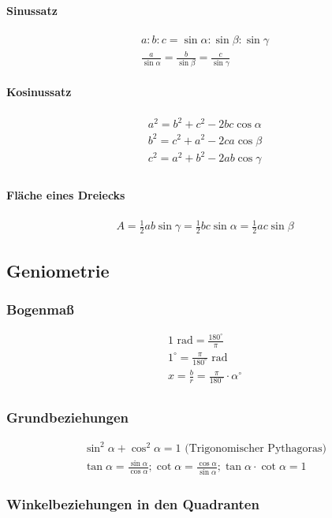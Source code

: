 \paragraph{Sinussatz}
\begin{align*}
    a : b : c = \sin \alpha : \sin \beta :\sin \gamma \\
    \frac{a}{\sin \alpha} = \frac{b}{\sin \beta} = \frac{c}{\sin \gamma}
\end{align*}

\paragraph{Kosinussatz}
\begin{align*}
    a^2 = b^2 + c^2 -2bc \cos \alpha \\
    b^2 = c^2 + a^2 -2ca \cos \beta \\
    c^2 = a^2 + b^2 -2ab \cos \gamma \\
\end{align*}

\paragraph{Fläche eines Dreiecks}
\begin{align*}
    A = \frac{1}{2} ab \sin \gamma = \frac{1}{2} bc \sin \alpha = \frac{1}{2} ac \sin \beta
\end{align*}


\subsection{Geniometrie}
\subsubsection{Bogenmaß}
\begin{align*}
    1  \textrm{ rad} = \frac{180^\circ}{\pi}        \\
    1 ^\circ = \frac{\pi}{180^\circ} \textrm{ rad}  \\
    x = \frac{b}{r} = \frac{\pi}{180^\circ} \cdot \alpha^\circ \\
\end{align*}

\subsubsection{Grundbeziehungen}
\begin{align*}
    \sin^2 \alpha + \cos^2 \alpha = 1 \textrm{ (Trigonomischer Pythagoras)} \\
    \tan \alpha = \frac{\sin \alpha}{\cos \alpha};
    \cot \alpha = \frac{\cos \alpha}{\sin \alpha};
    \tan \alpha \cdot \cot \alpha = 1
\end{align*}

\subsubsection{Winkelbeziehungen in den Quadranten}


